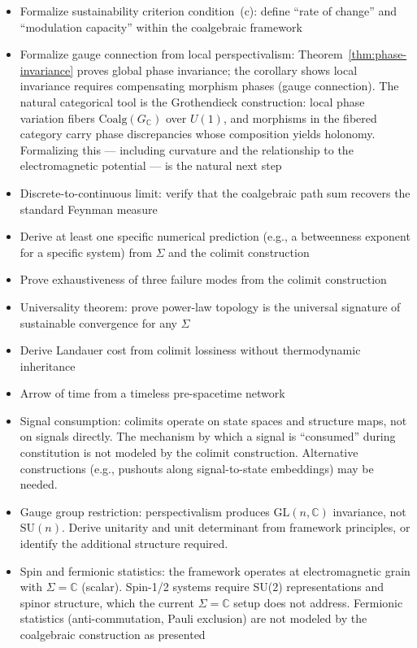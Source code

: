 \documentclass[12pt,a4paper]{article}
\begin{document}
\begin{itemize}
  \item Formalize sustainability criterion condition~(c): define ``rate of change'' and ``modulation capacity'' within the coalgebraic framework
  \item Formalize gauge connection from local perspectivalism: Theorem~\ref{thm:phase-invariance} proves global phase invariance; the corollary shows local invariance requires compensating morphism phases (gauge connection). The natural categorical tool is the Grothendieck construction: local phase variation fibers $\text{Coalg}(G_\mathbb{C})$ over $U(1)$, and morphisms in the fibered category carry phase discrepancies whose composition yields holonomy. Formalizing this --- including curvature and the relationship to the electromagnetic potential --- is the natural next step
  \item Discrete-to-continuous limit: verify that the coalgebraic path sum recovers the standard Feynman measure
  \item Derive at least one specific numerical prediction (e.g., a betweenness exponent for a specific system) from $\Sigma$ and the colimit construction
  \item Prove exhaustiveness of three failure modes from the colimit construction
  \item Universality theorem: prove power-law topology is the universal signature of sustainable convergence for any $\Sigma$
  \item Derive Landauer cost from colimit lossiness without thermodynamic inheritance
  \item Arrow of time from a timeless pre-spacetime network
  \item Signal consumption: colimits operate on state spaces and structure maps, not on signals directly. The mechanism by which a signal is ``consumed'' during constitution is not modeled by the colimit construction. Alternative constructions (e.g., pushouts along signal-to-state embeddings) may be needed.
  \item Gauge group restriction: perspectivalism produces $\text{GL}(n, \mathbb{C})$ invariance, not $\text{SU}(n)$. Derive unitarity and unit determinant from framework principles, or identify the additional structure required.
  \item Spin and fermionic statistics: the framework operates at electromagnetic grain with $\Sigma = \mathbb{C}$ (scalar). Spin-1/2 systems require SU(2) representations and spinor structure, which the current $\Sigma = \mathbb{C}$ setup does not address. Fermionic statistics (anti-commutation, Pauli exclusion) are not modeled by the coalgebraic construction as presented

\end{itemize}
\end{document}
